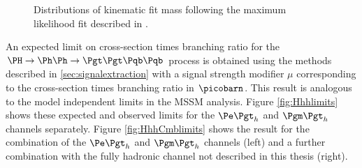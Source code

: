 \begin{figure}
\begin{center}

\end{center}
\caption{
Distributions of kinematic fit mass following the maximum likelihood fit
described in .}
\label{fig:PostFitMHetau}
\end{figure} 

An expected limit on cross-section times branching ratio for the $\Hhh$
process is obtained using the methods described in \ref{sec:signalextraction}
with a signal strength modifier $\mu$ corresponding to the cross-section times
branching ratio in $\picobarn$. This result is analogous to the model independent
limits in the \ac{MSSM} analysis. Figure \ref{fig:Hhhlimits} shows these
expected and observed limits for the $\etau$ and $\mutau$ channels separately.
Figure \ref{fig:HhhCmblimits} shows the result for the combination of the
$\etau$ and $\mutau$ channels (left) and a further combination with the fully
hadronic channel not described in this thesis (right).

